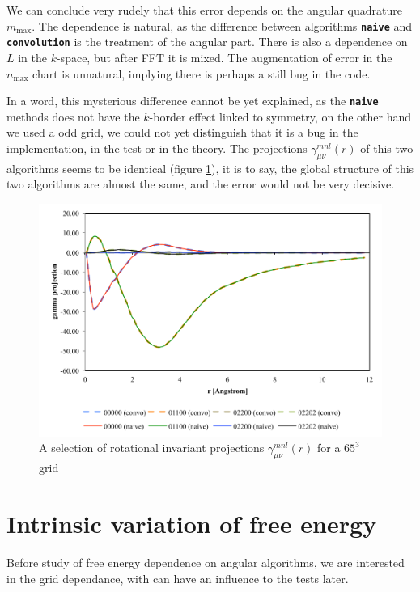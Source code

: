 We can conclude very rudely that this error depends on the angular
quadrature $m_{\max}$. The dependence is natural, as the difference
between algorithms \texttt{\textbf{naive}} and \texttt{\textbf{convolution}}
is the treatment of the angular part. There is also a dependence on
$L$ in the $k$-space, but after \acs{FFT} it is mixed. The augmentation
of error in the $n_{\max}$ chart is unnatural, implying there is
perhaps a still bug in the code.

In a word, this mysterious difference cannot be yet explained, as
the \texttt{\textbf{naive}} methods does not have the $k$-border
effect linked to symmetry, on the other hand we used a odd grid, we
could not yet distinguish that it is a bug in the implementation,
in the test or in the theory. The projections $\gamma_{\mu\nu}^{mnl}(r)$
of this two algorithms seems to be identical (figure \ref{fig:gamma-proj}),
it is to say, the global structure of this two algorithms are almost
the same, and the error would not be very decisive.

\begin{figure}[h]
\begin{centering}
\includegraphics[width=0.65\columnwidth]{_figure/results/gamma_proj}
\par\end{centering}
\caption{A selection of rotational invariant projections $\gamma_{\mu\nu}^{mnl}(r)$
for a $65^{3}$ grid\label{fig:gamma-proj}}
\end{figure}


\section{Intrinsic variation of free energy\label{sec:Intrinsic-variation-of}}

Before study of free energy dependence on angular algorithms, we are
interested in the grid dependance, with can have an influence to the
tests later.

